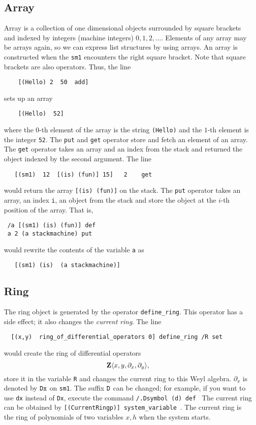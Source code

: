 \documentclass{article}
\begin{document}
\subsection{Array}
Array is a collection of one dimensional objects surrounded by square
brackets and
indexed by integers (machine integers) $0, 1, 2, \ldots$.
Elements of any array may be arrays again, so we can express
list structures by using arrays.
An array is constructed when the {\tt sm1} encounters the right square
bracket. 
Note that square brackets are also operators.
Thus, the line
\begin{verbatim}
    [(Hello) 2  50  add]
\end{verbatim}
sets up an array
\begin{verbatim}
    [(Hello)  52]
\end{verbatim}
where the $0$-th element of the array is the string
{\tt (Hello)}
and the $1$-th element is the integer {\tt 52}.
The {\tt put} and {\tt get} operator store and fetch an element of
an array.
The {\tt get} operator takes an array and an index from the stack
and returned the object indexed by the second argument.
The line
\begin{verbatim}
   [(sm1)  12  [(is) (fun)] 15]   2    get
\end{verbatim}
would return the array
{\tt [(is) (fun)]} on the stack.
The {\tt put} operator takes an array, an index {\tt i}, an object
from the stack
and store the object at the $i$-th position of the array.
That is,
\begin{verbatim}
 /a [(sm1) (is) (fun)] def
 a 2 (a stackmachine) put
\end{verbatim}
would rewrite the contents of the variable {\tt a} as
\begin{verbatim}
   [(sm1) (is)  (a stackmachine)]
\end{verbatim}

\subsection{Ring}

The ring object is generated by the operator {\tt define\_ring}.
This operator has a side effect;
it also changes the {\it current ring}.
The line
\begin{verbatim}
  [(x,y)  ring_of_differential_operators 0] define_ring /R set
\end{verbatim}
would create the ring of differential operators
$$ {\bf Z} \langle x, y, \partial_x, \partial_y \rangle, $$
store it in the variable {\tt R} and changes the current ring
to this Weyl algebra.
$\partial_x$ is denoted by ${\tt Dx}$ on {\tt sm1}.
The suffix ${\tt D}$ can be changed;
for example, if you want to use {\tt dx} instead of {\tt Dx},
execute the command
{\tt /\at \at \at}\verb+.Dsymbol (d) def +
The current ring can be obtained by
{\tt [(CurrentRingp)] system\_variable }.
The current ring is the ring of polynomials of
two variables $x, h$ when the system starts.
\end{document}
